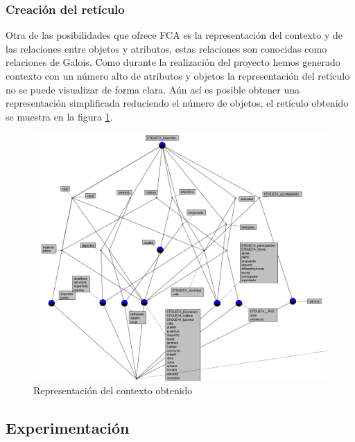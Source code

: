 \subsubsection{Creación del retículo}
Otra de las posibilidades que ofrece FCA es la representación del contexto y de las relaciones entre objetos y atributos, estas relaciones son conocidas como relaciones de Galois. Como durante la realización del proyecto hemos generado contexto con un número alto de atributos y objetos la representación del retículo no se puede visualizar de forma clara.
Aún así es posible obtener una representación simplificada reduciendo el número de objetos, el retículo obtenido se muestra en la figura \ref{fig:contexto}.
\begin{center}
\begin{figure}

\hspace*{-3cm}\includegraphics[scale=0.83]{fca/lattice_deportes.png}
\caption{Representación del contexto obtenido}
\label{fig:contexto}
\end{figure}
\end{center}
\subsection{Experimentación}

